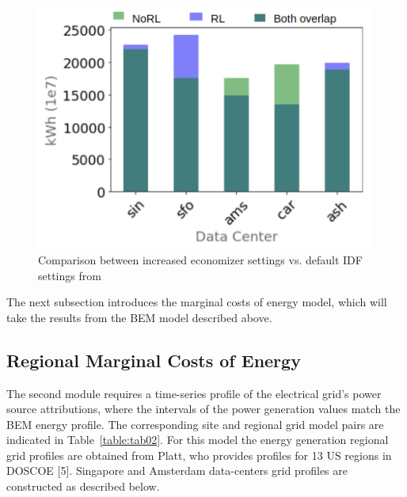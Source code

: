   \begin{figure}
    \centering
    \includegraphics[scale=.50]{marginal_energy_cost/img/total_energy_comp2.png}
    \caption[Comparison of Economizer Settings in E+]{Comparison between increased economizer settings  vs. default IDF settings from \citep{kumar20} }
    \label{fig:total_energy_comp}
    \end{figure}

  The next subsection introduces the marginal costs of energy model, which will take the results from the BEM model described above.

\subsection{Regional Marginal Costs of Energy}
The second module requires a time-series profile of the electrical grid’s power source attributions, where the intervals of the power generation values match the BEM energy profile. The corresponding  site and regional grid model pairs are indicated in Table~\ref{table:tab02}. For this model the energy generation regional grid profiles are obtained from Platt, who provides profiles for 13 US regions in DOSCOE [5]. Singapore and Amsterdam data-centers grid profiles are constructed as described below.


